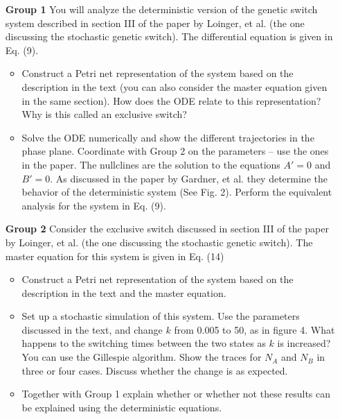 \documentclass[12pt]{article}
\begin{document}
%
\begin{enumerate}
\item[\bf Group 1] You will analyze the deterministic version of the genetic switch system described in section III of the paper by Loinger, et al. 
(the one discussing the stochastic genetic switch).  The differential equation is given in Eq. (9). 
\begin{itemize}
\item Construct a Petri net representation of the system based on the description in the text  (you can
also consider the master equation given in the same section).   
How does the ODE relate to this representation? Why is this called an exclusive switch?
\item Solve the ODE numerically and show the different trajectories in the phase plane.
Coordinate with Group 2 on the parameters -- use the ones in the paper.  
The nullclines are the solution to the equations $A' = 0$ and $B' = 0$.  As discussed in the paper
by Gardner, et al. they determine the behavior of the deterministic system (See Fig. 2). Perform the equivalent
analysis for the system in Eq. (9).
\end{itemize}



\item[\bf Group 2] Consider the exclusive switch discussed in section III of the paper by Loinger, et al. 
(the one discussing the stochastic genetic switch). The master equation for this system is given in Eq. (14) 
\begin{itemize}
\item Construct a Petri net representation of the system based on the description in the text 
and the master equation. 
\item  Set up a stochastic simulation of this system. Use the parameters discussed in the text, 
and change $k$ from 0.005 to 50, as in figure 4. What happens to the switching times 
between the two states as $k$ is increased? You can use the Gillespie algorithm. 
Show the traces for $N_{A}$ and $N_{B}$ in three or four cases.   Discuss whether the
change is as expected.
\item Together with Group 1 explain whether or whether not these results can be explained 
using the deterministic equations.
\end{itemize}


\end{enumerate}
\end{document}
